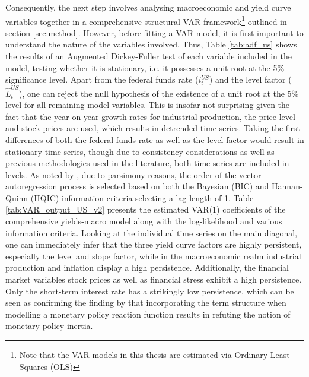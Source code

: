 Consequently, the next step involves analysing macroeconomic and yield curve variables together in a comprehensive structural VAR framework\footnote{Note that the VAR models in this thesis are estimated via Ordinary Least Squares (OLS)} outlined in section \ref{sec:method}. 
However, before fitting a VAR model, it is first important to understand the nature of the variables involved. Thus, Table \ref{tab:adf_us} shows the results of an Augmented Dickey-Fuller test of each variable included in the model, testing whether it is stationary, i.e. it possesses a unit root at the 5\% significance level. 
Apart from the federal funds rate ($i^{US}_{t}$) and the level factor ($\hat{L}^{US}_{t}$), one can reject the null hypothesis of the existence of a unit root at the 5\% level for all remaining model variables. 
This is insofar not surprising given the fact that the year-on-year growth rates for industrial production, the price level and stock prices are used, which results in detrended time-series. 
Taking the first differences of both the federal funds rate as well as the level factor would result in stationary time series, though due to consistency considerations as well as previous methodologies used in the literature, both time series are included in levels. 
As noted by \citet{morales2010real}, due to parsimony reasons, the order of the vector autoregression process is selected based on both the Bayesian (BIC) and Hannan-Quinn (HQIC) information criteria selecting a lag length of 1. 
Table \ref{tab:VAR_output_US_v2} presents the estimated VAR(1) coefficients of the comprehensive yields-macro model along with the log-likelihood and various information criteria. 
Looking at the individual time series on the main diagonal, one can immediately infer that the three yield curve factors are highly persistent, especially the level and slope factor, while in the macroeconomic realm industrial production and inflation display a high persistence. 
Additionally, the financial market variables stock prices as well as financial stress exhibit a high persistence.  
Only the short-term interest rate has a strikingly low persistence, which can be seen as confirming the finding by \citet{rudebusch2005monetary} that incorporating the term structure when modelling a monetary policy reaction function results in refuting the notion of monetary policy inertia. 


